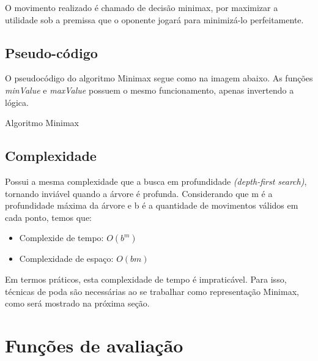 \documentclass[sigplan,screen]{acmart}
\begin{document}
O movimento realizado é chamado de decisão minimax, por maximizar a utilidade sob a premissa que o oponente jogará para minimizá-lo perfeitamente.

\subsection{Pseudo-código}
O pseudocódigo do algoritmo Minimax segue como na imagem abaixo. 
As funções {\itshape minValue} e {\itshape maxValue} possuem o mesmo funcionamento, apenas invertendo a lógica.

\begin{algorithm}
\DontPrintSemicolon
  \caption{Algoritmo Minimax}
  \label{alg:generator}


\end{algorithm}

\subsection{Complexidade}

Possui a mesma complexidade que a busca em profundidade {\itshape (depth-first search)}, tornando inviável quando a árvore é profunda.
Considerando que m é a profundidade máxima da árvore e b é a quantidade de movimentos válidos em cada ponto, temos que:
\begin{itemize}
  \item Complexide de tempo: $O(b^m)$
  \item Complexidade de espaço: $O(bm)$
\end{itemize}

Em termos práticos, esta complexidade de tempo é impraticável. Para isso, técnicas de poda são necessárias ao se trabalhar como representação Minimax, como será mostrado na próxima seção.

\section{Funções de avaliação}
\end{document}
